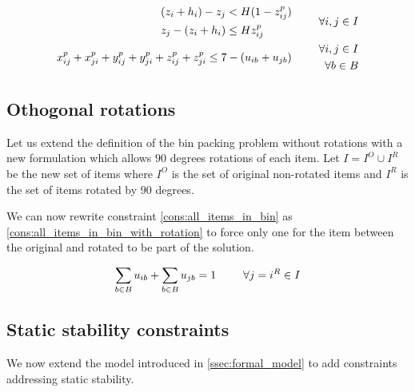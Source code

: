 \begin{eqnarray}
    \begin{aligned} (z_i + h_i) - z_j &< H(1 - z^p_{ij}) \\
                    z_j - (z_i + h_i) &\le H z^p_{ij} \end{aligned} \hspace{.5cm}& & \forall i,j \in I \label{cons:z_prec} \\
    x^p_{ij} + x^p_{ji} + y^p_{ij} + y^p_{ji} + z^p_{ij} + z^p_{ji} \le 7 - (u_{ib} + u_{jb}) \hspace{.5cm}& & \begin{aligned} \forall i,j \in I \\ 
                                                                                                                                \forall b \in B 
                                                                                                                        \end{aligned} \label{cons:no_overlap}
\end{eqnarray}
\subsection*{Othogonal rotations}

Let us extend the definition of the bin packing problem without rotations with a new formulation which allows $90$ degrees rotations of each item.
Let $I = I^O \cup I^R$ be the new set of items where $I^O$ is the set of original non-rotated items and $I^R$ is the set of items rotated by $90$ degrees.

We can now rewrite constraint \ref{cons:all_items_in_bin} as \ref{cons:all_items_in_bin_with_rotation} to force only one for the item between the original and rotated to be part of the solution.

\begin{align}
    \sum_{b \in B} u_{ib} + \sum_{b \in B} u_{jb} = 1  \hspace{.5cm}& & \forall j = i^R \in I \label{cons:all_items_in_bin_with_rotation}
\end{align}

\subsection*{Static stability constraints}

We now extend the model introduced in \cref{ssec:formal_model} to add constraints addressing static stability.

